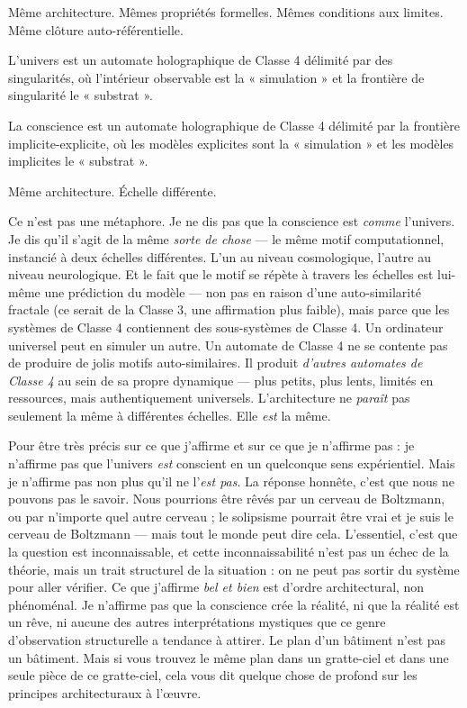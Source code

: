 \documentclass[11pt, twoside, openright]{book}
\begin{document}
Même architecture. Mêmes propriétés formelles. Mêmes conditions aux limites. Même clôture auto-référentielle.

L'univers est un automate holographique de Classe 4 délimité par des singularités, où l'intérieur observable est la « simulation » et la frontière de singularité le « substrat ».

La conscience est un automate holographique de Classe 4 délimité par la frontière implicite-explicite, où les modèles explicites sont la « simulation » et les modèles implicites le « substrat ».

Même architecture. Échelle différente.

Ce n'est pas une métaphore. Je ne dis pas que la conscience est \textit{comme} l'univers. Je dis qu'il s'agit de la même \textit{sorte de chose} --- le même motif computationnel, instancié à deux échelles différentes. L'un au niveau cosmologique, l'autre au niveau neurologique. Et le fait que le motif se répète à travers les échelles est lui-même une prédiction du modèle --- non pas en raison d'une auto-similarité fractale (ce serait de la Classe 3, une affirmation plus faible), mais parce que les systèmes de Classe 4 contiennent des sous-systèmes de Classe 4. Un ordinateur universel peut en simuler un autre. Un automate de Classe 4 ne se contente pas de produire de jolis motifs auto-similaires. Il produit \textit{d'autres automates de Classe 4} au sein de sa propre dynamique --- plus petits, plus lents, limités en ressources, mais authentiquement universels. L'architecture ne \textit{paraît} pas seulement la même à différentes échelles. Elle \textit{est} la même.

Pour être très précis sur ce que j'affirme et sur ce que je n'affirme pas : je n'affirme pas que l'univers \textit{est} conscient en un quelconque sens expérientiel. Mais je n'affirme pas non plus qu'il ne l'\textit{est pas}. La réponse honnête, c'est que nous ne pouvons pas le savoir. Nous pourrions être rêvés par un cerveau de Boltzmann, ou par n'importe quel autre cerveau ; le solipsisme pourrait être vrai et je suis le cerveau de Boltzmann --- mais tout le monde peut dire cela. L'essentiel, c'est que la question est inconnaissable, et cette inconnaissabilité n'est pas un échec de la théorie, mais un trait structurel de la situation : on ne peut pas sortir du système pour aller vérifier. Ce que j'affirme \textit{bel et bien} est d'ordre architectural, non phénoménal. Je n'affirme pas que la conscience crée la réalité, ni que la réalité est un rêve, ni aucune des autres interprétations mystiques que ce genre d'observation structurelle a tendance à attirer. Le plan d'un bâtiment n'est pas un bâtiment. Mais si vous trouvez le même plan dans un gratte-ciel et dans une seule pièce de ce gratte-ciel, cela vous dit quelque chose de profond sur les principes architecturaux à l'œuvre.
\end{document}
